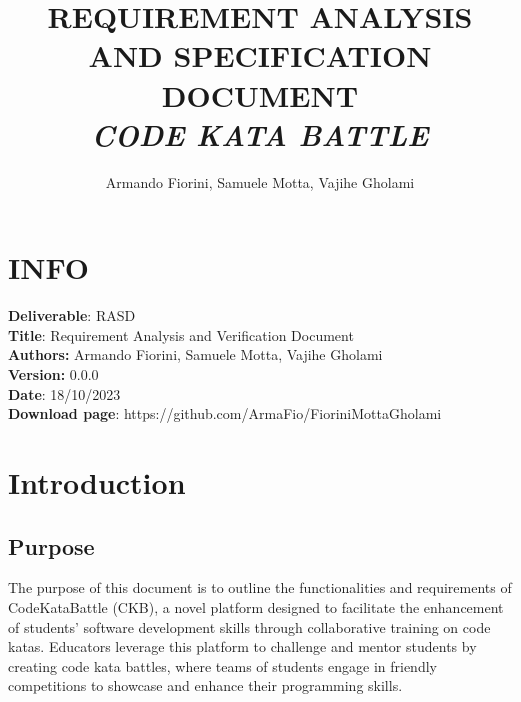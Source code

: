 \documentclass{article}
\title{\textbf{REQUIREMENT ANALYSIS AND SPECIFICATION DOCUMENT}\\\textit{CODE KATA BATTLE}}
\author{Armando Fiorini, Samuele Motta, Vajihe Gholami}
\date{}
\begin{document}
\maketitle
\section*{INFO}
\textbf{Deliverable}: RASD\\
\textbf{Title}: Requirement Analysis and Verification Document\\
\textbf{Authors:} Armando Fiorini, Samuele Motta, Vajihe Gholami\\
\textbf{Version:} 0.0.0\\
\textbf{Date}: 18/10/2023\\
\textbf{Download page}: https://github.com/ArmaFio/FioriniMottaGholami\\
\newpage
\tableofcontents
\newpage


\section{Introduction}
\subsection{Purpose}
The purpose of this document is to outline the functionalities and requirements of CodeKataBattle (CKB), a novel platform designed to facilitate the enhancement of students' software development skills through collaborative training on code katas. Educators leverage this platform to challenge and mentor students by creating code kata battles, where teams of students engage in friendly competitions to showcase and enhance their programming skills.
\end{document}
